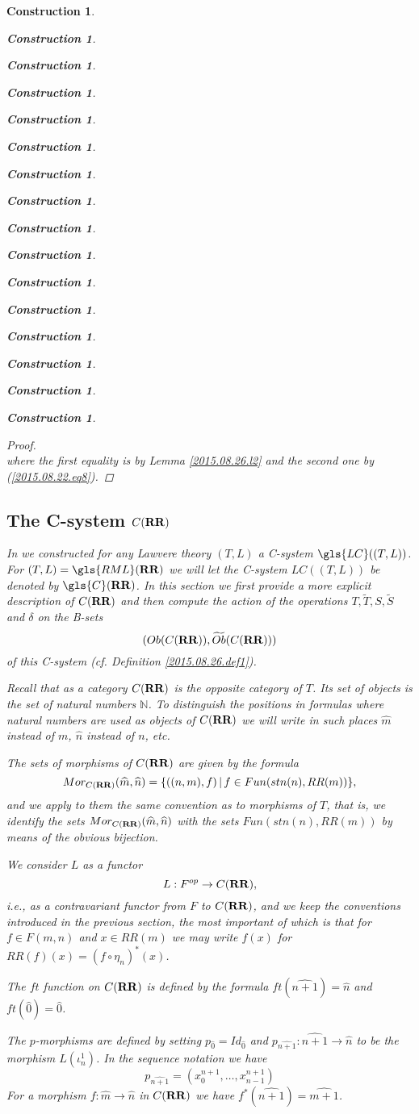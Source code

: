 \documentclass[onecolumn,12pt]{amsart}
\numberwithin{proposition}{subsection}
\newtheorem{construction}[proposition]{Construction}
\newcommand{\sr}{\rightarrow}
\newcommand{\nn}{{\mathbb N}}
\newcommand{\nat}{\nn}
\newcommand{\wt}{\widetilde}
\newcommand{\wh}{\widehat}
\newcommand{\mbind}[1]{{#1^*}}
\newcommand{\RR}{{\bf RR}}
\begin{document}
\begin{construction}
\begin{construction}
\begin{construction}
\begin{construction}
\begin{construction}
\begin{construction}
\begin{construction}
\begin{construction}
\begin{construction}
\begin{construction}
\begin{construction}
\begin{construction}
\begin{construction}
\begin{construction}
\begin{construction}
\begin{construction}
\begin{proof}
\begin{equation*}
\end{equation*}
where the first equality is by Lemma \ref{2015.08.26.l2} and the second one by
(\ref{2015.08.22.eq8}).
\end{proof}
%

\subsection{The C-system $C(\RR)$}
%
\label{CRR}

In \cite{LandC} we constructed for any Lawvere theory $(T,L)$ a C-system
$\gls{LC}((T,L))$. For $(T,L)=\gls{RML}(\RR)$ we will let the C-system $LC((T,L))$ be denoted by
$\gls{C}(\RR)$. In this section we first provide a more explicit description of
$C(\RR)$ and then compute the action of the operations $T,\wt{T},S,\wt{S}$ and
$\delta$ on the B-sets $$(Ob(C(\RR)),\wt{Ob}(C(\RR)))$$ of this C-system
(cf.{} Definition \ref{2015.08.26.def1}).

Recall that as a category $C(\RR)$ is the opposite category of $T$.  Its set of
objects is the set of natural numbers $\nat$. To distinguish the positions in
formulas where natural numbers are used as objects of $C(\RR)$ we will write in
such places $\wh{m}$ instead of $m$, $\wh{n}$ instead of $n$, etc.

The sets of morphisms of $C(\RR)$ are given by the formula 
%
$$Mor_{C(\RR)}(\wh{m},\wh{n})=\{((n,m),f)\,|\,f\in Fun(stn(n),RR(m))\},$$
%
and we apply to them the same convention as to morphisms of $T$, that is, we
identify the sets $Mor_{C(\RR)}(\wh{m},\wh{n})$ with the sets
$Fun(stn(n),RR(m))$ by means of the obvious bijection.

We consider $L$ as a functor
%
$${L}:F^{op}\sr C(\RR),$$
%
i.e., as a contravariant functor from $F$ to $C(\RR)$, and we keep the conventions
introduced in the previous section, the most important of which is that for
$f\in F(m,n)$ and $x\in RR(m)$ we may write $f(x)$ for 
$RR(f)(x)=\mbind{(f\circ \eta_{n})}(x)$.

The $ft$ function on $C(\RR)$ is defined by the formula $ft(\wh{n+1})=\wh{n}$
and $ft(\wh{0})=\wh{0}$.

The $p$-morphisms are defined by setting $p_{\wh{0}}=Id_{\wh{0}}$ and
$p_{\wh{n+1}}:\wh{n+1}\sr \wh{n}$ to be the morphism $L(\iota_n^1)$. In the
sequence notation we have
%
\begin{equation}\label{2015.08.24.eq6}
p_{\wh{n+1}}=(x_0^{n+1},\dots,x_{n-1}^{n+1})
\end{equation}%
%
For a morphism $f:\wh{m}\sr \wh{n}$ in $C(\RR)$ we have $f^*(\wh{n+1})=\wh{m+1}$. 


\end{construction}
\end{construction}
\end{construction}
\end{construction}
\end{construction}
\end{construction}
\end{construction}
\end{construction}
\end{construction}
\end{construction}
\end{construction}
\end{construction}
\end{construction}
\end{construction}
\end{construction}
\end{construction}
\end{document}
